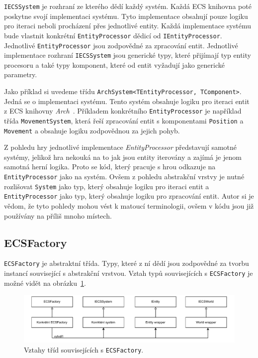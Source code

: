\texttt{IECSSystem} je rozhraní ze kterého dědí každý systém. Každá ECS knihovna poté poskytne svojí implementaci systému. Tyto implementace obsahují pouze logiku pro iteraci neboli procházení přes jednotlivé entity. Každá implementace systému bude vlastnit konkrétní \texttt{EntityProcessor} dědicí od \texttt{IEntityProcessor}. Jednotlivé \texttt{EntityProcessor} jsou zodpovědné za zpracování entit. Jednotlivé implementace rozhraní \texttt{IECSSystem} jsou generické typy, které přijímají typ entity procesoru a také typy komponent, které od entit vyžadují jako generické parametry.

Jako příklad si uvedeme třídu \texttt{ArchSystem<TEntityProcessor, TComponent>}. Jedná se o implementaci systému. Tento systém obsahuje logiku pro iteraci entit z ECS knihovny \textit{Arch}~\cite{Arch}. Příkladem konkrétního \texttt{EntityProcessor} je například třída \texttt{MovementSystem}, která řeší zpracování entit s komponentami \texttt{Position} a \texttt{Movement} a obsahuje logiku zodpovědnou za jejich pohyb.

Z pohledu hry jednotlivé implementace \textit{EntityProcessor} představují samotné systémy, jelikož hra nekouká na to jak jsou entity iterovány a zajímá je jenom samotná herní logika. Proto se kód, který pracuje s hrou odkazuje na \texttt{EntityProcessor} jako na systém. Ovšem z pohledu abstrakční vrstvy je nutné rozlišovat \texttt{System} jako typ, který obsahuje logiku pro iteraci entit a \texttt{EntityProcessor} jako typ, který obsahuje logiku pro zpracování entit. Autor si je vědom, že tyto pohledy mohou vést k matoucí terminologii, ovšem v kódu jsou již používány na příliš mnoho místech.

\subsection{ECSFactory}
\texttt{ECSFactory} je abstraktní třída. Typy, které z ní dědí jsou zodpovědné za tvorbu instancí související s abstrakční vrstvou. Vztah typů souvisejících s \texttt{ECSFactory} je možné vidět na obrázku~\ref{fig:abstract-layer-ecsfactory}.

\begin{figure}[!htb]
  \centering
  \includegraphics[width=1.0\linewidth]{img/abstract-layer-ecsfactory.pdf}
  \caption{Vztahy tříd souvisejících s \texttt{ECSFactory}.}
  \label{fig:abstract-layer-ecsfactory}
\end{figure}

